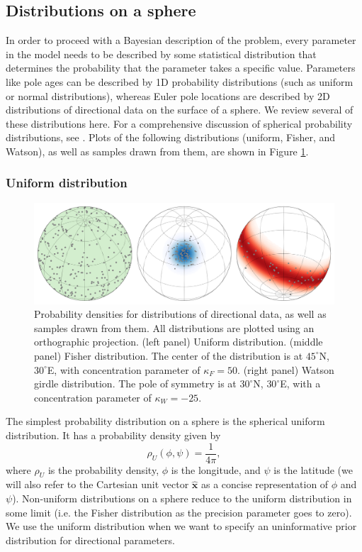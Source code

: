 \documentclass[]{agujournal2019}
\begin{document}
\subsection*{Distributions on a sphere}

In order to proceed with a Bayesian description of the problem, every parameter in the model needs to be described by some statistical distribution that determines the probability that the parameter takes a specific value. Parameters like pole ages can be described by 1D probability distributions (such as uniform or normal distributions), whereas Euler pole locations are described by 2D distributions of directional data on the surface of a sphere. We review several of these distributions here. For a comprehensive discussion of spherical probability distributions, see . Plots of the following distributions (uniform, Fisher, and Watson), as well as samples drawn from them, are shown in Figure \ref{fig:distributions}. 

\subsubsection*{Uniform distribution}
\begin{figure}
\centering
\includegraphics[width=\textwidth]{fig_direction_distributions.png}
\caption[Spherical probability distributions.]{Probability densities for distributions of directional data, as well as samples drawn from them. All distributions are plotted using an orthographic projection. (left panel) Uniform distribution. (middle panel) Fisher distribution. The center of the distribution is at $45^\circ$N, $30^\circ$E, with concentration parameter of $\kappa_F=50$. (right panel) Watson girdle distribution. The pole of symmetry is at $30^\circ$N, $30^\circ$E, with a concentration parameter of $\kappa_W=-25$.}
\label{fig:distributions}
\end{figure}

The simplest probability distribution on a sphere is the spherical uniform distribution. It has a probability density given by
\begin{equation}
  \rho_U(\phi, \psi) = \frac{1}{4 \pi},
\end{equation}
where $\rho_U$ is the probability density, $\phi$ is the longitude, and $\psi$ is the latitude (we will also refer to the Cartesian unit vector $\hat{\mathbf{x}}$ as a concise representation of $\phi$ and $\psi$). Non-uniform distributions on a sphere reduce to the uniform distribution in some limit (i.e. the Fisher distribution as the precision parameter goes to zero). We use the uniform distribution when we want to specify an uninformative prior distribution for directional parameters.
\end{document}
